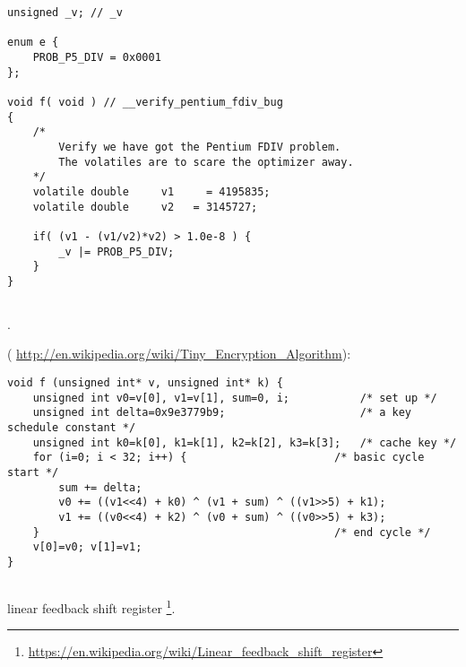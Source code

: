 \begin{lstlisting}
unsigned _v; // _v

enum e {
    PROB_P5_DIV = 0x0001
};

void f( void ) // __verify_pentium_fdiv_bug
{
    /*
        Verify we have got the Pentium FDIV problem.
        The volatiles are to scare the optimizer away.
    */
    volatile double     v1     = 4195835;
    volatile double     v2   = 3145727;

    if( (v1 - (v1/v2)*v2) > 1.0e-8 ) {
        _v |= PROB_P5_DIV;
    }
}
\end{lstlisting}

\subsection{}


.

 ( \url{http://en.wikipedia.org/wiki/Tiny_Encryption_Algorithm}):

\begin{lstlisting}
void f (unsigned int* v, unsigned int* k) {
    unsigned int v0=v[0], v1=v[1], sum=0, i;           /* set up */
    unsigned int delta=0x9e3779b9;                     /* a key schedule constant */
    unsigned int k0=k[0], k1=k[1], k2=k[2], k3=k[3];   /* cache key */
    for (i=0; i < 32; i++) {                       /* basic cycle start */
        sum += delta;
        v0 += ((v1<<4) + k0) ^ (v1 + sum) ^ ((v1>>5) + k1);
        v1 += ((v0<<4) + k2) ^ (v0 + sum) ^ ((v0>>5) + k3);  
    }                                              /* end cycle */
    v[0]=v0; v[1]=v1;
}
\end{lstlisting}


\subsection{}

linear feedback shift register
\footnote{\url{https://en.wikipedia.org/wiki/Linear_feedback_shift_register}}.

